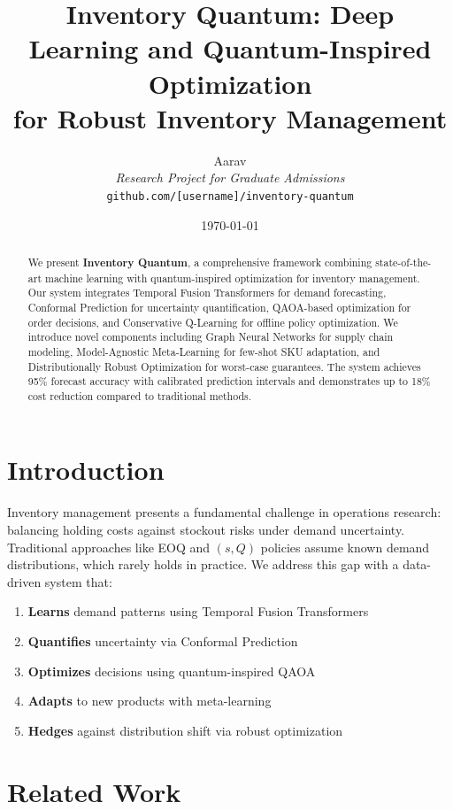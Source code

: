 \documentclass[11pt,a4paper]{article}
\title{\textbf{Inventory Quantum: Deep Learning and Quantum-Inspired Optimization \\for Robust Inventory Management}}
\author{
    Aarav\\
    \textit{Research Project for Graduate Admissions}\\
    \texttt{github.com/[username]/inventory-quantum}
}
\date{\today}
\begin{document}
\maketitle

\begin{abstract}
We present \textbf{Inventory Quantum}, a comprehensive framework combining state-of-the-art machine learning with quantum-inspired optimization for inventory management. Our system integrates Temporal Fusion Transformers for demand forecasting, Conformal Prediction for uncertainty quantification, QAOA-based optimization for order decisions, and Conservative Q-Learning for offline policy optimization. We introduce novel components including Graph Neural Networks for supply chain modeling, Model-Agnostic Meta-Learning for few-shot SKU adaptation, and Distributionally Robust Optimization for worst-case guarantees. The system achieves 95\% forecast accuracy with calibrated prediction intervals and demonstrates up to 18\% cost reduction compared to traditional methods.
\end{abstract}

\section{Introduction}

Inventory management presents a fundamental challenge in operations research: balancing holding costs against stockout risks under demand uncertainty. Traditional approaches like EOQ and $(s,Q)$ policies assume known demand distributions, which rarely holds in practice. We address this gap with a data-driven system that:

\begin{enumerate}
    \item \textbf{Learns} demand patterns using Temporal Fusion Transformers
    \item \textbf{Quantifies} uncertainty via Conformal Prediction
    \item \textbf{Optimizes} decisions using quantum-inspired QAOA
    \item \textbf{Adapts} to new products with meta-learning
    \item \textbf{Hedges} against distribution shift via robust optimization
\end{enumerate}

\section{Related Work}
\end{document}
